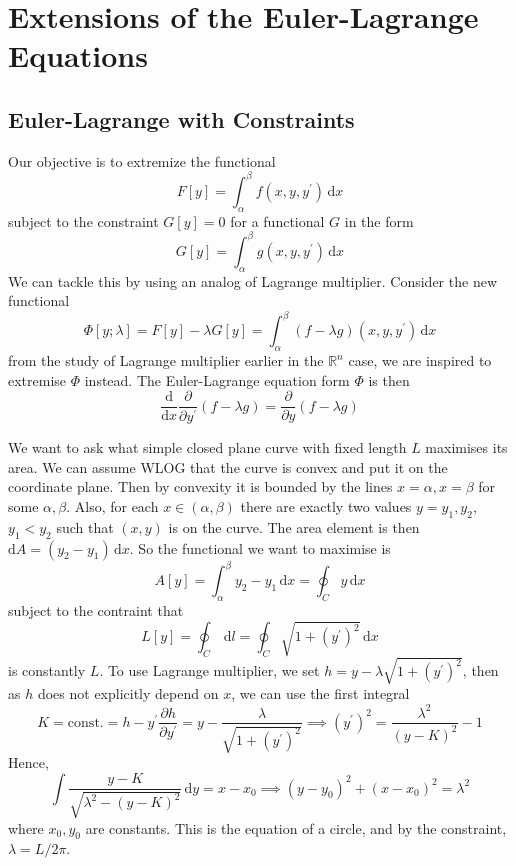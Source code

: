 \section{Extensions of the Euler-Lagrange Equations}
\subsection{Euler-Lagrange with Constraints}
Our objective is to extremize the functional
$$F[y]=\int_\alpha^\beta f(x,y,y^\prime)\,\mathrm dx$$
subject to the constraint $G[y]=0$ for a functional $G$ in the form
$$G[y]=\int_\alpha^\beta g(x,y,y^\prime)\,\mathrm dx$$
We can tackle this by using an analog of Lagrange multiplier.
Consider the new functional
$$\Phi[y;\lambda]=F[y]-\lambda G[y]=\int_\alpha^\beta (f-\lambda g)(x,y,y^\prime)\,\mathrm dx$$
from the study of Lagrange multiplier earlier in the $\mathbb R^n$ case, we are inspired to extremise $\Phi$ instead.
The Euler-Lagrange equation form $\Phi$ is then
$$\frac{\mathrm d}{\mathrm dx}\frac{\partial}{\partial y^\prime}(f-\lambda g)=\frac{\partial}{\partial y}(f-\lambda g)$$
\begin{example}
    We want to ask what simple closed plane curve with fixed length $L$ maximises its area.
    We can assume WLOG that the curve is convex and put it on the coordinate plane.
    Then by convexity it is bounded by the lines $x=\alpha,x=\beta$ for some $\alpha,\beta$.
    Also, for each $x\in(\alpha,\beta)$ there are exactly two values $y=y_1,y_2$, $y_1<y_2$ such that $(x,y)$ is on the curve.
    The area element is then $\mathrm dA=(y_2-y_1)\,\mathrm dx$.
    So the functional we want to maximise is
    $$A[y]=\int_\alpha^\beta y_2-y_1\,\mathrm dx=\oint_Cy\,\mathrm dx$$
    subject to the contraint that
    $$L[y]=\oint_C\,\mathrm dl=\oint_C\sqrt{1+(y^\prime)^2}\,\mathrm dx$$
    is constantly $L$.
    To use Lagrange multiplier, we set $h=y-\lambda\sqrt{1+(y^\prime)^2}$, then as $h$ does not explicitly depend on $x$, we can use the first integral
    $$K=\text{const.}=h-y^\prime\frac{\partial h}{\partial y^\prime}=y-\frac{\lambda}{\sqrt{1+(y^\prime)^2}}\implies (y^\prime)^2=\frac{\lambda^2}{(y-K)^2}-1$$
    Hence,
    $$\int\frac{y-K}{\sqrt{\lambda^2-(y-K)^2}}\,\mathrm dy=x-x_0\implies (y-y_0)^2+(x-x_0)^2=\lambda^2$$
    where $x_0,y_0$ are constants.
    This is the equation of a circle, and by the constraint, $\lambda=L/2\pi$.
\end{example}
